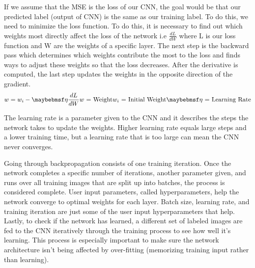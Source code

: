 If we assume that the MSE is the loss of our CNN, the goal would be that our predicted label (output of CNN) is the same as our training label. To do this, we need to minimize the loss function. To do this, it is necessary to find out which weights most directly affect the loss of the network i.e $\frac{dL}{dW}$ where L is our loss function and W are the weights of a specific layer. The next step is the backward pass which determines which weights contribute the most to the loss and finds ways to adjust these weights so that the loss decreases. After the derivative is computed, the last step updates the weights in the opposite direction of the gradient. 
\begin{equation}
w=w_i - \eta\frac{dL}{dW}
\\\text{$w$ = Weight}
\\\text{$w_i$ = Initial Weight}
\\\text{$\eta$ = Learning Rate}
\end{equation}

The learning rate is a parameter given to the CNN and it describes the steps the network takes to update the weights. Higher learning rate equals large steps and a lower training time, but a learning rate that is too large can mean the CNN never converges. 

Going through backpropagation consists of one training iteration. Once the network completes a specific number of iterations, another parameter given, and runs over all training images that are split up into batches, the process is considered complete. User input parameters, called hyperparameters, help the network converge to optimal weights for each layer. Batch size, learning rate, and training iteration are just some of the user input hyperparameters that help. Lastly, to check if the network has learned, a different set of labeled images are fed to the CNN iteratively through the training process to see how well it's learning. This process is especially important to make sure the network architecture isn't being affected by over-fitting (memorizing training input rather than learning). 

